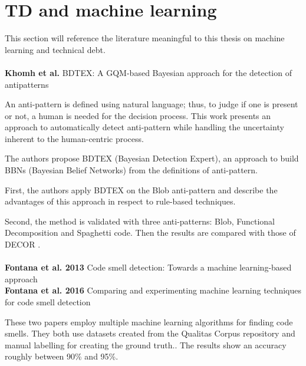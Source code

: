 \section{TD and machine learning}

This section will reference the literature meaningful to this thesis on machine learning and technical debt.
\\
\\

\textbf{Khomh et al.} \cite{khomh2011bdtex} BDTEX: A GQM-based Bayesian approach for the detection of antipatterns

An anti-pattern is defined using natural language; thus, to judge if one is present or not, a human is needed for the decision process.
This work presents an approach to automatically detect anti-pattern while handling the uncertainty inherent to the human-centric process. 

The authors propose BDTEX (Bayesian Detection Expert), an approach to build BBNs (Bayesian Belief Networks) from the definitions of anti-pattern.

First, the authors apply BDTEX on the Blob anti-pattern and describe the advantages of this approach in respect to rule-based techniques.

Second, the method is validated with three anti-patterns: Blob, Functional Decomposition and Spaghetti code. Then the results are compared with those of DECOR \cite{moha2009decor}.
\\
\\
\textbf{Fontana et al. 2013} \cite{fontana2013code} Code smell detection: Towards a machine learning-based approach
\\
\textbf{Fontana et al. 2016} \cite{fontana2016comparing} Comparing and experimenting machine learning techniques for code smell detection

These two papers employ multiple machine learning algorithms for finding code smells. They both use datasets created from the Qualitas Corpus repository \cite{tempero2010qualitas} and manual labelling for creating the ground truth..
The results show an accuracy roughly between 90\% and 95\%. 

